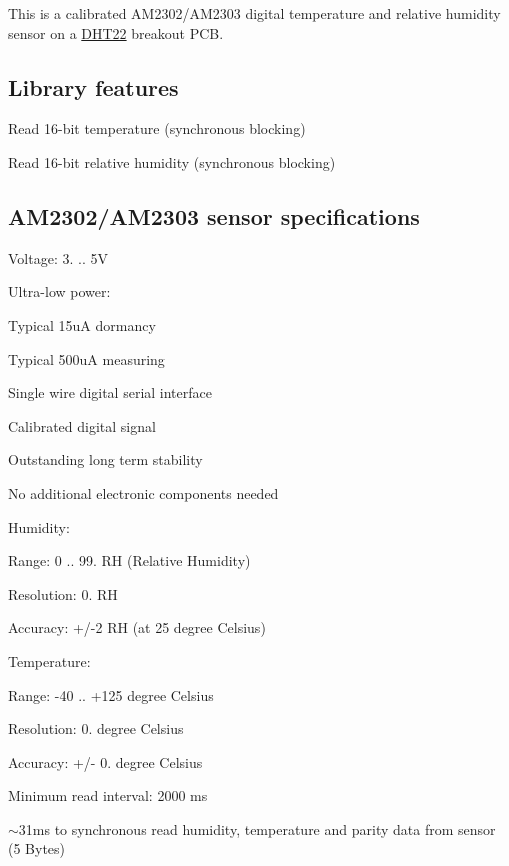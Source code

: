 \href{https://travis-ci.org/Erriez/ErriezDHT22}{\tt }

This is a calibrated A\+M2302/\+A\+M2303 digital temperature and relative humidity sensor on a \hyperlink{class_d_h_t22}{D\+H\+T22} breakout P\+CB.



\subsection*{Library features}


\begin{DoxyItemize}
\item Read 16-\/bit temperature (synchronous blocking)
\item Read 16-\/bit relative humidity (synchronous blocking)
\end{DoxyItemize}

\subsection*{A\+M2302/\+A\+M2303 sensor specifications}


\begin{DoxyItemize}
\item Voltage\+: 3. .. 5V
\item Ultra-\/low power\+:
\begin{DoxyItemize}
\item Typical 15uA dormancy
\item Typical 500uA measuring
\end{DoxyItemize}
\item Single wire digital serial interface
\item Calibrated digital signal
\item Outstanding long term stability
\item No additional electronic components needed
\item Humidity\+:
\begin{DoxyItemize}
\item Range\+: 0 .. 99. RH (Relative Humidity)
\item Resolution\+: 0. RH
\item Accuracy\+: +/-\/2 RH (at 25 degree Celsius)
\end{DoxyItemize}
\item Temperature\+:
\begin{DoxyItemize}
\item Range\+: -\/40 .. +125 degree Celsius
\item Resolution\+: 0. degree Celsius
\item Accuracy\+: +/-\/ 0. degree Celsius
\end{DoxyItemize}
\item Minimum read interval\+: 2000 ms
\item $\sim$31ms to synchronous read humidity, temperature and parity data from sensor (5 Bytes)
\end{DoxyItemize}

